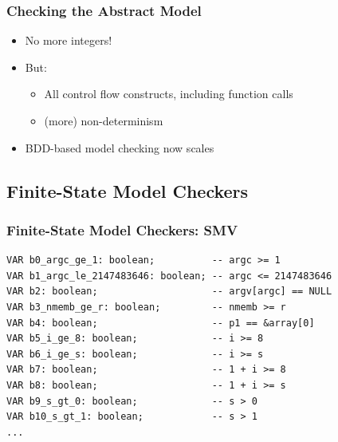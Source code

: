 \begin{frame}
\frametitle{Checking the Abstract Model}

\begin{itemize}
\item No more integers!
\vfill

\item But:
\begin{itemize}
\item All control flow constructs, including function calls
\item (more) non-determinism
\end{itemize}
\vfill

\item[\mycheck] BDD-based model checking now scales
\end{itemize}

\end{frame}


\subsection{Finite-State Model Checkers}

\begin{frame}[fragile]
\frametitle{Finite-State Model Checkers: SMV}


\begin{lstlisting}[basicstyle=\footnotesize,morekeywords={VAR,boolean}]
VAR b0_argc_ge_1: boolean;          -- argc >= 1
VAR b1_argc_le_2147483646: boolean; -- argc <= 2147483646
VAR b2: boolean;                    -- argv[argc] == NULL
VAR b3_nmemb_ge_r: boolean;         -- nmemb >= r
VAR b4: boolean;                    -- p1 == &array[0]
VAR b5_i_ge_8: boolean;             -- i >= 8
VAR b6_i_ge_s: boolean;             -- i >= s
VAR b7: boolean;                    -- 1 + i >= 8
VAR b8: boolean;                    -- 1 + i >= s
VAR b9_s_gt_0: boolean;             -- s > 0
VAR b10_s_gt_1: boolean;            -- s > 1
...
\end{lstlisting}

\end{frame}

